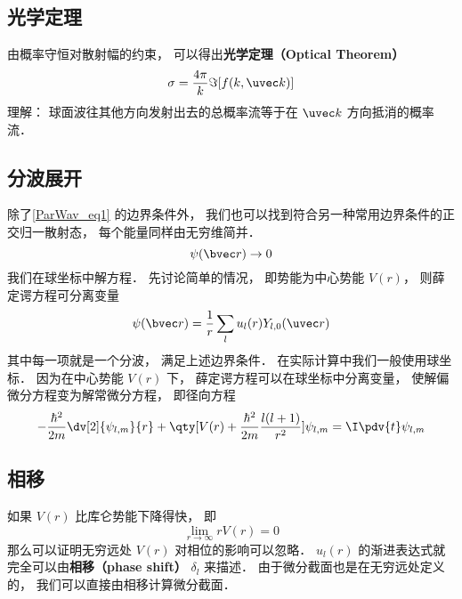 \subsection{光学定理}
由概率守恒对散射幅的约束， 可以得出\textbf{光学定理（Optical Theorem）}
\begin{equation}
\sigma = \frac{4\pi}{k} \Im[f(k, \uvec k)]
\end{equation}
理解： 球面波往其他方向发射出去的总概率流等于在 $\uvec k$ 方向抵消的概率流．

\subsection{分波展开}

除了\autoref{ParWav_eq1} 的边界条件外， 我们也可以找到符合另一种常用边界条件的正交归一散射态， 每个能量同样由无穷维简并．
\begin{equation}
\psi(\bvec r) \rightarrow 0
\end{equation}
我们在球坐标中解方程． 先讨论简单的情况， 即势能为中心势能 $V(r)$， 则薛定谔方程可分离变量 %
\begin{equation}
\psi(\bvec r) = \frac{1}{r} \sum_l u_l(r) Y_{l,0}(\uvec r)
\end{equation}
其中每一项就是一个分波， 满足上述边界条件． 在实际计算中我们一般使用球坐标． 因为在中心势能 $V(r)$ 下， 薛定谔方程可以在球坐标中分离变量， 使解偏微分方程变为解常微分方程， 即径向方程 %
\begin{equation}
-\frac{\hbar^2}{2m} \dv[2]{\psi_{l,m}}{r} + \qty[V(r) + \frac{\hbar^2}{2m}\frac{l(l + 1)}{r^2}]\psi_{l,m} = \I \pdv{t} \psi_{l,m}
\end{equation}

\subsection{相移}
如果 $V(r)$ 比库仑势能下降得快， 即
\begin{equation}
\lim_{r\to\infty} r V(r) = 0
\end{equation}
那么可以证明无穷远处 $V(r)$ 对相位的影响可以忽略． $u_l(r)$ 的渐进表达式就完全可以由\textbf{相移（phase shift）} $\delta_l$ 来描述． 由于微分截面也是在无穷远处定义的， 我们可以直接由相移计算微分截面．

